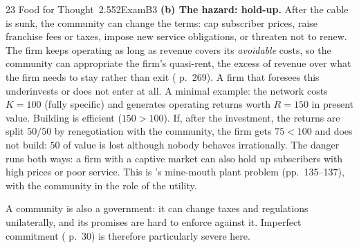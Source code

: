 \begin{exsol}{23}{\MR{} Food for Thought~2.5}{52}{Exam}{B3}
\textbf{(b) The hazard: hold-up.} After the cable is sunk, the community can change the terms:
cap subscriber prices, raise franchise fees or taxes, impose new service obligations, or threaten
not to renew. The firm keeps operating as long as revenue covers its \emph{avoidable} costs, so
the community can appropriate the firm's quasi-rent, the excess of revenue over what the firm
needs to stay rather than exit (\MR{} p.~269). A firm that foresees this underinvests or does not
enter at all. A minimal example: the network costs $K = 100$ (fully specific) and generates
operating returns worth $R = 150$ in present value. Building is efficient ($150 > 100$). If,
after the investment, the returns are split $50/50$ by renegotiation with the community, the firm
gets $75 < 100$ and does not build: $50$ of value is lost although nobody behaves irrationally.
The danger runs both ways: a firm with a captive market can also hold up subscribers with high
prices or poor service. This is \MR's mine-mouth plant problem (pp.~135--137), with the community
in the role of the utility.

A community is also a government: it can change taxes and regulations unilaterally, and its
promises are hard to enforce against it. Imperfect commitment (\MR{} p.~30) is therefore
particularly severe here.


\end{exsol}
